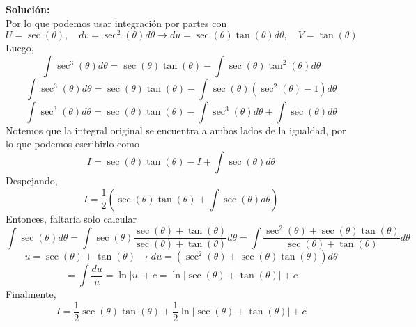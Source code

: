 \documentclass[12pt]{article}
\newenvironment{solucion}
{\begin{mdframed}[backgroundcolor=black!10]
		{\bf Solución:}\\
	}
	{
	\end{mdframed}
}
\newenvironment{preguntas}
{\begin{enumerate}\itemsep12pt
	}
	{
	\end{enumerate}
}
\newcommand{\ra}{\rightarrow}
\begin{document}
\begin{preguntas}
\begin{solucion}
$$$$
Por lo que podemos usar integración por partes con
$$U = \sec(\theta), \quad dv = \sec^2(\theta)d\theta \ra 
du = \sec(\theta)\tan(\theta)d\theta, \quad V = \tan(\theta)$$
Luego,
$$\displaystyle\int \sec^3(\theta)d\theta = 
\sec(\theta)\tan(\theta) - \displaystyle\int \sec(\theta)\tan^2(\theta)d\theta
$$
$$\displaystyle\int \sec^3(\theta)d\theta = 
\sec(\theta)\tan(\theta) - \displaystyle\int \sec(\theta)(\sec^2(\theta)-1)d\theta
$$
$$\displaystyle\int \sec^3(\theta)d\theta = 
\sec(\theta)\tan(\theta) - \displaystyle\int \sec^3(\theta)d\theta + \displaystyle\int \sec(\theta)d\theta
$$
Notemos que la integral original se encuentra a ambos lados de la igualdad, por lo que podemos escribirlo como
$$I = 
\sec(\theta)\tan(\theta) - I + \displaystyle\int \sec(\theta)d\theta
$$
Despejando,
$$I = 
\dfrac{1}{2}\left(\sec(\theta)\tan(\theta) + \displaystyle\int \sec(\theta)d\theta\right)
$$
Entonces, faltaría solo calcular
$$\displaystyle\int \sec(\theta)d\theta =
\displaystyle\int \sec(\theta)\dfrac{\sec(\theta) + \tan(\theta)}{\sec(\theta) + \tan(\theta)}d\theta =
\displaystyle\int \dfrac{\sec^2(\theta) + \sec(\theta)\tan(\theta)}{\sec(\theta) + \tan(\theta)}d\theta
$$
$$u = \sec(\theta) + \tan(\theta) \ra du = (\sec^2(\theta) + \sec(\theta)\tan(\theta))d\theta$$
$$= \displaystyle\int \dfrac{du}{u} = \ln|u| + c = \ln|\sec(\theta) + \tan(\theta)| + c
$$
Finalmente,
$$I = 
\dfrac{1}{2}\sec(\theta)\tan(\theta) + \dfrac{1}{2}\ln|\sec(\theta) + \tan(\theta)| + c
$$
\end{solucion}
\end{preguntas}
\end{document}
